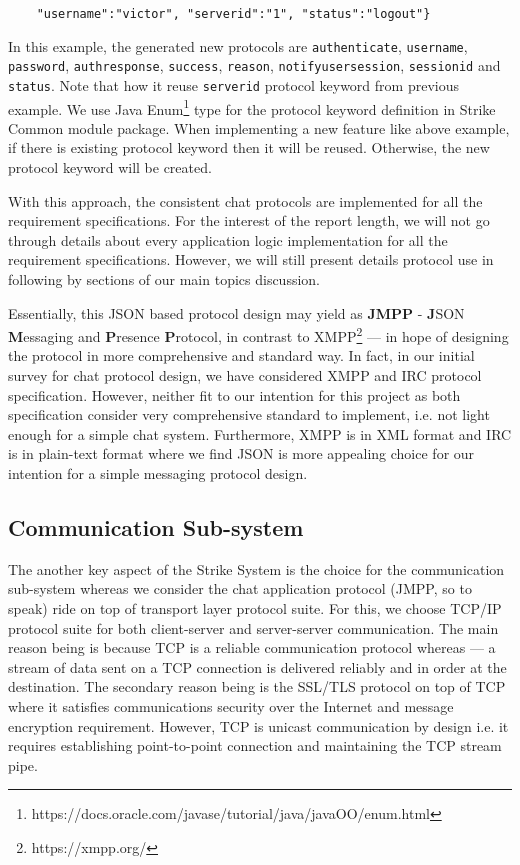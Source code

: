 \documentclass[dareport.tex]{subfiles}
\begin{document}
\begin{enumerate}[leftmargin=*]
\begin{small}
\begin{verbatim}
    "username":"victor", "serverid":"1", "status":"logout"}
\end{verbatim}
\end{small}
In this example, the generated new protocols are \verb|authenticate|, \verb|username|, \verb|password|, \verb|authresponse|, \verb|success|, \verb|reason|, \verb|notifyusersession|, \verb|sessionid| and \verb|status|. Note that how it reuse \verb|serverid| protocol keyword from previous example. We use Java Enum\footnote{https://docs.oracle.com/javase/tutorial/java/javaOO/enum.html} type for the protocol keyword definition in Strike Common module package. When implementing a new feature like above example, if there is existing protocol keyword then it will be reused. Otherwise, the new protocol keyword will be created. 
\end{enumerate}

With this approach, the consistent chat protocols are implemented for all the requirement specifications. For the interest of the report length, we will not go through details about every application logic implementation for all the requirement specifications. However, we will still present details protocol use in following by sections of our main topics discussion.

Essentially, this JSON based protocol design may yield as \textbf{JMPP} - \textbf{J}SON \textbf{M}essaging and \textbf{P}resence \textbf{P}rotocol, in contrast to XMPP\footnote{https://xmpp.org/} --- in hope of designing the protocol in more comprehensive and standard way. In fact, in our initial survey for chat protocol design, we have considered XMPP and IRC protocol specification. However, neither fit to our intention for this project as both specification consider very comprehensive standard to implement, i.e. not light enough for a simple chat system. Furthermore, XMPP is in XML format\cite{xmpp} and IRC is in plain-text format\cite{irc} where we find JSON is more appealing choice for our intention for a simple messaging protocol design.

\subsection{Communication Sub-system}
The another key aspect of the Strike System is the choice for the communication sub-system whereas we consider the chat application protocol (JMPP, so to speak) ride on top of transport layer protocol suite. For this, we choose TCP/IP protocol suite for both client-server and server-server communication. The main reason being is because TCP is a reliable communication protocol whereas --- a stream of data sent on a TCP connection is delivered reliably and in order at the destination\cite{tcp}. The secondary reason being is the SSL/TLS protocol on top of TCP where it satisfies communications security over the Internet and message encryption requirement\cite{tls}. However, TCP is unicast communication by design i.e. it requires establishing point-to-point connection and maintaining the TCP stream pipe. 
\end{document}
